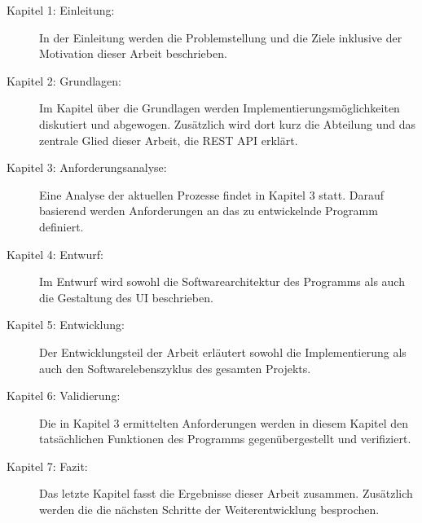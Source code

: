 \begin{description}

    \item[Kapitel 1: Einleitung:]
    In der Einleitung werden die Problemstellung und die Ziele inklusive der Motivation
    dieser Arbeit beschrieben.
    
    \item[Kapitel 2: Grundlagen:]
    Im Kapitel über die Grundlagen werden Implementierungsmöglichkeiten diskutiert
    und abgewogen. Zusätzlich wird dort kurz die Abteilung und das zentrale Glied
    dieser Arbeit, die \gls{REST} \gls{API} erklärt.

    \item[Kapitel 3: Anforderungsanalyse:]
    Eine Analyse der aktuellen Prozesse findet in Kapitel 3 statt. Darauf basierend werden Anforderungen an 
    das zu entwickelnde Programm definiert.

    \item[Kapitel 4: Entwurf:]
    Im Entwurf wird sowohl die Softwarearchitektur des Programms als auch die Gestaltung 
    des \gls{UI} beschrieben.
    
    \item[Kapitel 5: Entwicklung:]
    Der Entwicklungsteil der Arbeit erläutert sowohl die Implementierung als auch 
    den Softwarelebenszyklus des gesamten Projekts.

    \item[Kapitel 6: Validierung:]
    Die in Kapitel 3 ermittelten Anforderungen werden in diesem Kapitel den
    tatsächlichen Funktionen des Programms gegenübergestellt und verifiziert.

    \item[Kapitel 7: Fazit:]
    Das letzte Kapitel fasst die Ergebnisse dieser Arbeit zusammen. Zusätzlich werden die
    die nächsten Schritte der Weiterentwicklung besprochen.

\end{description}
\newpage



